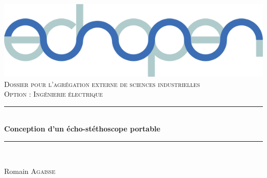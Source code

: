 \documentclass[12pt]{article}
\begin{document}
\begin{titlepage}

\newcommand{\HRule}{\rule{\linewidth}{0.5mm}} %

\center %
 

\includegraphics[scale=.3]{Images_Rapport/logo2}
\vspace{30pt}
\textsc{\LARGE }\\[1.5cm] %
\textsc{\LARGE Dossier pour l'agrégation externe de sciences industrielles}\\[0.5cm] %
\textsc{\Large Option : Ingénierie électrique}\\[0.5cm] %

\vspace{30pt}
\HRule \\[0.4cm]
{ \huge \bfseries Conception d'un écho-stéthoscope portable}\\[0.4cm] %
\HRule \\[1.5cm]
 
\vspace{30pt}
\begin{center} \large
Romain \textsc{Agaisse} %
\end{center}
~


\end{titlepage}
\end{document}
